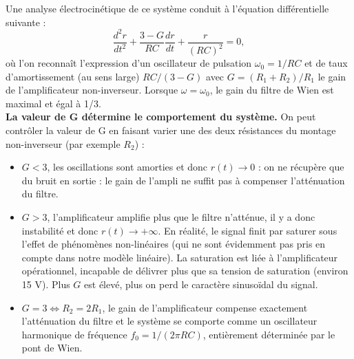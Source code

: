 \documentclass[11pt,a4paper]{report}
\begin{document}
Une analyse électrocinétique de ce système conduit à l'équation différentielle suivante :
\begin{equation}
	\boxed{\frac{d^2r}{dt^2} + \frac{3-G}{RC}\frac{dr}{dt} + \frac{r}{(RC)^2} = 0},
\end{equation}
où l'on reconnaît l'expression d'un oscillateur de pulsation $\omega_0 = {1}/{RC}$ et de taux d'amortissement (au sens large) $RC/(3-G)$ avec $G = (R_1 + R_2)/R_1$ le gain de l'amplificateur non-inverseur. Lorsque $\omega = \omega_0$, le gain du filtre de Wien est maximal et égal à 1/3.\\
	
\textbf{La valeur de G détermine le comportement du système.} On peut contrôler la valeur de G en faisant varier une des deux résistances du montage non-inverseur (par exemple $R_2$) :\\
\begin{itemize}
	\item $G < 3$, les oscillations sont amorties et donc $r(t) \rightarrow 0$ : on ne récupère que du 			bruit en sortie : le gain de l'ampli ne suffit pas à compenser l'atténuation du filtre.
	\item $G > 3$, l'amplificateur amplifie plus que le filtre n'atténue, il y a donc instabilité et 			donc $r(t) \rightarrow +\infty$. En réalité, le signal finit par saturer sous l'effet de 				phénomènes non-linéaires (qui ne sont évidemment pas pris en compte dans notre modèle 					linéaire). La saturation est liée à l'amplificateur opérationnel, incapable de délivrer plus 			que sa tension de saturation (environ 15 V). Plus $G$ est élevé, plus on perd le caractère 				sinusoïdal du signal.
	\item $G = 3 \Leftrightarrow R_2 = 2R_1$, le gain de l'amplificateur compense exactement 					l'atténuation du filtre et le système se comporte comme un oscillateur harmonique de fréquence 			$f_0 = 1/(2\pi RC)$, entièrement déterminée par le pont de Wien. 
\end{itemize}
\end{document}
